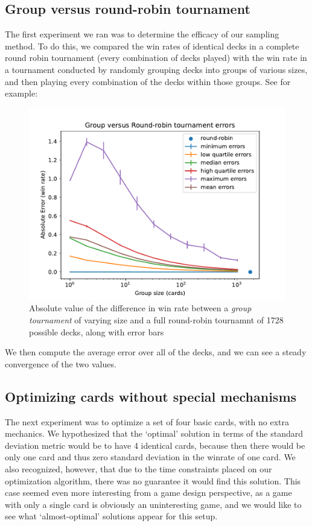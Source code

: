 \subsection{Group versus round-robin tournament}

The first experiment we ran was to determine the efficacy of our sampling method. To do this, we compared the win rates of identical decks in a complete round robin tournament (every combination of decks played) with the win rate in a tournament conducted by randomly grouping decks into groups of various sizes, and then playing every combination of the decks within those groups. See for example:

\begin{figure}[t]
	\centering
	\includegraphics[width=0.9\columnwidth]{group_vs_rr_fig}
	\caption{Absolute value of the difference in win rate between a \textit{group tournament} of varying size and a full round-robin tournamnt of 1728 possible decks, along with error bars}
	\label{fig:group_vs_rr}
\end{figure}


We then compute the average error over all of the decks, and we can see a steady convergence of the two values.


 \subsection{Optimizing cards without special mechanisms}

The next experiment was to optimize a set of four basic cards, with no extra mechanics. We hypothesized that the `optimal' solution in terms of the standard deviation metric would be to have 4 identical cards, because then there would be only one card and thus zero standard deviation in the winrate of one card. We also recognized, however, that due to the time constraints placed on our optimization algorithm, there was no guarantee it would find this solution. This case seemed even more interesting from a game design perspective, as a game with only a single card is obviously an uninteresting game, and we would like to see what `almost-optimal' solutions appear for this setup.

